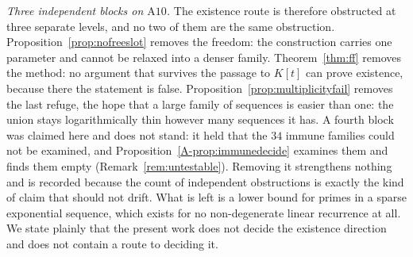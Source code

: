 \documentclass[11pt]{article}
\theoremstyle{definition}
\begin{document}
\emph{Three independent blocks on $\mathrm{A}10$.} The existence route is therefore obstructed at three separate levels, and no two of them are the
same obstruction. Proposition~\ref{prop:nofreeslot} removes the freedom: the construction carries
one parameter and cannot be relaxed into a denser family. Theorem~\ref{thm:ff} removes the
method: no argument that survives the passage to $K[t]$ can prove existence, because there the
statement is false. Proposition~\ref{prop:multiplicityfail} removes the last refuge, the hope that a
large family of sequences is easier than one: the union stays logarithmically thin however many
sequences it has. A fourth block was claimed here and does not stand: it held that the $34$ immune
families could not be examined, and Proposition~\ref{A-prop:immunedecide} examines them and finds them
empty (Remark~\ref{rem:untestable}). Removing it strengthens nothing and is recorded because the
count of independent obstructions is exactly the kind of claim that should not drift.
What is left is a lower bound for primes in a sparse exponential sequence, which exists for no
non-degenerate linear recurrence at all. We state plainly that the present work does not decide the
existence direction and does not contain a route to deciding it.
\end{document}
